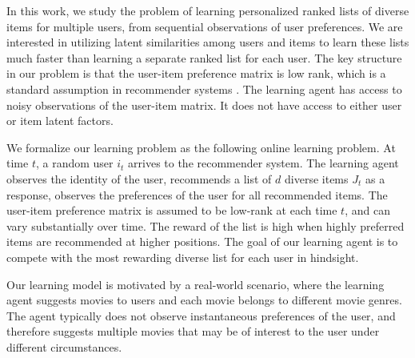 
In this work, we study the problem of learning personalized ranked lists of diverse items for multiple users, from sequential observations of user preferences. We are interested in utilizing latent similarities among users and items to learn these lists much faster than learning a separate ranked list for each user. The key structure in our problem is that the user-item preference matrix is low rank, which is a standard assumption in recommender systems \citep{koren2009matrix,ricci2011liorrokach}. The learning agent has access to noisy observations of the user-item matrix. It does not have access to either user or item latent factors.

We formalize our learning problem as the following online learning problem. At time $t$, a random user $i_t$ arrives to the recommender system. The learning agent observes the identity of the user, recommends a list of $d$ diverse items $J_t$ as a response, observes the preferences of the user for all recommended items. The user-item preference matrix is assumed to be low-rank at each time $t$, and can vary substantially over time. The reward of the list is high when highly preferred items are recommended at higher positions. The goal of our learning agent is to compete with the most rewarding diverse list for each user in hindsight.

Our learning model is motivated by a real-world scenario, where the learning agent suggests movies to users and each movie belongs to different movie genres. The agent typically does not observe instantaneous preferences of the user, and therefore suggests multiple movies that may be of interest to the user under different circumstances. 

